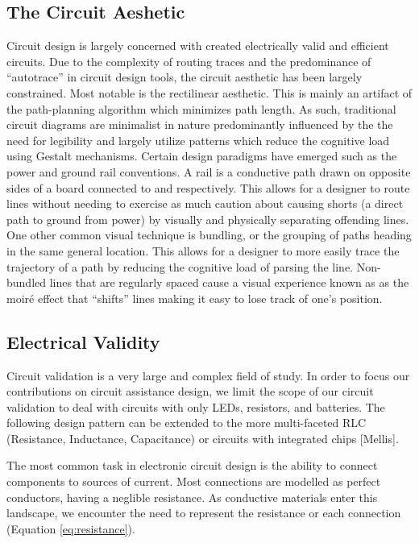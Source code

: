 \documentclass{sigchi}
\begin{document}
    \subsection{The Circuit Aeshetic} Circuit design is largely concerned with created electrically valid and efficient circuits.  Due to the complexity of routing traces and the predominance of ``autotrace'' in circuit design tools, the circuit aesthetic has been largely constrained. Most notable is the rectilinear aesthetic. This is mainly an artifact of the path-planning algorithm which minimizes path length. As such, traditional circuit diagrams are minimalist in nature predominantly influenced by the the need for legibility and largely utilize patterns which reduce the cognitive load using Gestalt mechanisms. Certain design paradigms have emerged such as the power and ground rail conventions. A rail is a conductive path drawn on opposite sides of a board connected to  and  respectively. This allows for a designer to route lines without needing to exercise as much caution about causing shorts (a direct path to ground from power) by visually and physically separating offending lines. One other common visual technique is bundling, or the grouping of paths heading in the same general location. This allows for a designer to more easily trace the trajectory of a path by reducing the cognitive load of parsing the line. Non-bundled lines that are regularly spaced cause a visual experience known as as the moir\'e effect that ``shifts'' lines making it easy to lose track of one's position.

 

    \subsection{Electrical Validity}
     Circuit validation is a very large and complex field of study. In order to focus our contributions on circuit assistance design, we limit the scope of our circuit validation to deal with circuits with only LEDs, resistors, and batteries. The following design pattern can be extended to the more multi-faceted RLC (Resistance, Inductance, Capacitance) or circuits with integrated chips [Mellis].

    The most common task in electronic circuit design is the ability to connect components to sources of current. Most connections are modelled as perfect conductors, having a neglible resistance. As conductive materials enter this landscape, we encounter the need to represent the resistance or each connection (Equation \ref{eq:resistance}).
\end{document}
